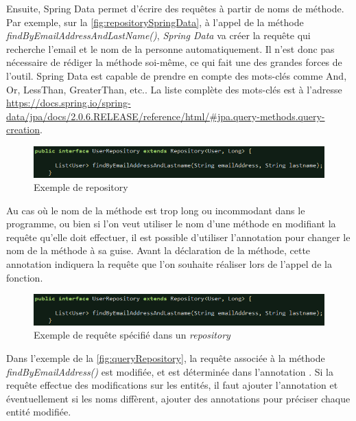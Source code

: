 \documentclass{polytech/polytech}
\begin{document}
Ensuite, Spring Data permet d’écrire des requêtes à partir de noms de méthode. Par exemple, sur la \autoref{fig:repositorySpringData}, à l’appel de la méthode \textit{findByEmailAddressAndLastName()}, \textit{Spring Data} va créer la requête qui recherche l’email et le nom de la personne automatiquement. Il n’est donc pas nécessaire de rédiger la méthode soi-même, ce qui fait une des grandes forces de l’outil. Spring Data est capable de prendre en compte des mots-clés comme And, Or, LessThan, GreaterThan, etc.. La liste complète des mots-clés est à l’adresse \url{https://docs.spring.io/spring-data/jpa/docs/2.0.6.RELEASE/reference/html/#jpa.query-methods.query-creation}.

\begin{figure}
	\includegraphics[scale=0.75]{images/repositorySpringData}
	\caption{Exemple de repository}
	\label{fig:repositorySpringData}
\end{figure}

Au cas où le nom de la méthode est trop long ou incommodant dans le programme, ou bien si l’on veut utiliser le nom d’une méthode en modifiant la requête qu’elle doit effectuer, il est possible d’utiliser l’annotation  pour changer le nom de la méthode à sa guise. Avant la déclaration de la méthode, cette annotation indiquera la requête que l’on souhaite réaliser lors de l’appel de la fonction.

\begin{figure}
	\includegraphics[scale=0.75]{images/repositorySpringData}
	\caption{Exemple de requête spécifié dans un \textit{repository}}
	\label{fig:queryRepository}
\end{figure}

Dans l’exemple de la \autoref{fig:queryRepository}, la requête associée à la méthode \textit{findByEmailAddress()} est modifiée, et est déterminée dans l’annotation . Si la requête effectue des modifications sur les entités, il faut ajouter l’annotation  et éventuellement si les noms diffèrent, ajouter des annotations  pour préciser chaque entité modifiée. 
\end{document}
